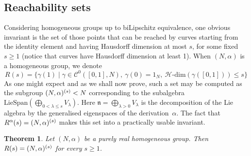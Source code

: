 \documentclass[a4paper,12pt]{amsart}
\newcommand{\pp}{\mathrm}
\newcommand{\Hdim}{\mathcal{H}\text{-}\mathrm{dim}} %
\theoremstyle{plain}
\theoremstyle{definition}
\theoremstyle{plain}
\newtheorem{lause}[maar]{Theorem}
\theoremstyle{remark}
\begin{document}
\subsection{Reachability sets}
\label{sec:reachability}

Considering homogeneous groups up to biLipschitz equi\-va\-len\-ce, one obvious invariant is the set of those points that can be reached by curves starting from the identity element and having Hausdorff dimension at most \(s \), for some fixed \( s \ge 1 \) (notice that curves have Hausdorff dimension at least 1). When \( (N,\alpha) \) is a homogeneous group, we denote
\begin{equation*}
R(s) 
= \{ \gamma(1) \mid \gamma \in \mathcal{C}^0([0,1],N), \: \gamma(0) = 1_N, \:\Hdim(\gamma([0,1])) \le s \}
\end{equation*}
As one might expect and as we shall now prove, such a set may be computed as the subgroup \( (N,\alpha)^{(s)} < N \)  corresponding to the subalgebra \( \pp{LieSpan}(\bigoplus_{0 < \lambda \le s } V_\lambda) \). Here \( \mathfrak{n} = \bigoplus_{\lambda >0 } V_\lambda \) is the decomposition of the Lie algebra by the generalised eigenspaces of the derivation~\( \alpha \). 
The fact that \( R^\alpha(s) = (N,\alpha)^{(s)} \) makes this set into a practically usable invariant.


\begin{lause} \label{thm:computable-reachability-sets}
	Let \( (N,\alpha) \) be a purely real homogeneous group. Then \( R(s) = (N,\alpha)^{(s)} \) for every \( s \ge 1 \).
\end{lause}
\end{document}
